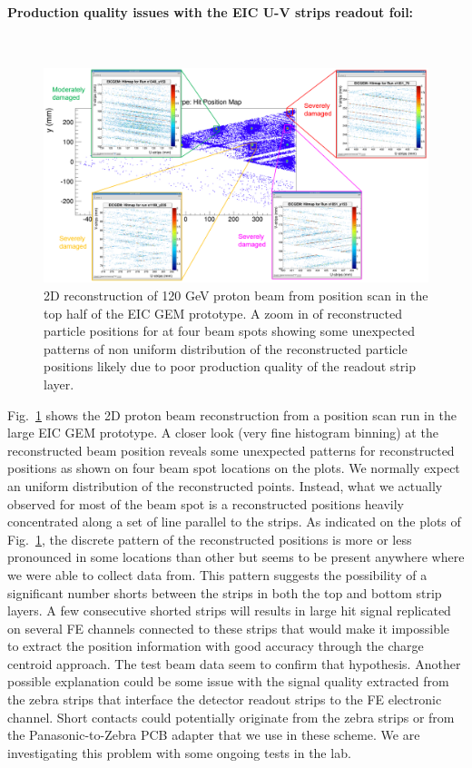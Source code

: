 \paragraph*{Production quality issues with the EIC U-V strips readout foil:}\mbox{}\\
\begin{figure}[htb]
\centering
\includegraphics[width=1\columnwidth,trim={0pt 0mm 0pt 0mm},clip]{UVa_plots/eicPosScan}
\caption{\label{fig:eicPosScan}  2D  reconstruction of 120 GeV proton beam from position scan in the top half of the EIC GEM prototype. A zoom in of  reconstructed particle positions for at four beam spots showing some unexpected patterns of non uniform distribution of the reconstructed particle positions likely due to poor production quality of the readout strip layer.}
\end{figure}
Fig.~\ref{fig:eicPosScan} shows the 2D proton beam reconstruction from a position scan run in the large EIC GEM prototype. A closer look (very fine histogram binning) at the reconstructed beam position  reveals some unexpected patterns for reconstructed positions as shown on  four beam spot locations on the plots. We normally expect an uniform distribution of the reconstructed points. Instead, what we actually observed for most of the beam spot is a reconstructed positions heavily concentrated along a set of line parallel to the strips. As indicated on the plots of Fig.~\ref{fig:eicPosScan}, the discrete pattern of the reconstructed positions is more or less pronounced in some locations than  other but seems to be present anywhere where we were able to collect data from. This pattern suggests the possibility of a significant number shorts between the strips in both the top and bottom strip layers. A few consecutive shorted strips will results in  large hit signal replicated on several FE channels connected to these strips that would make it impossible to extract the  position information with good accuracy through the charge centroid approach. The test beam data  seem to confirm that hypothesis. Another possible explanation could be some issue with the signal quality extracted from the zebra strips that interface the detector readout strips to the FE electronic channel. Short contacts could potentially originate from the zebra strips or from the Panasonic-to-Zebra PCB adapter that we use in these scheme. We are investigating this  problem with some ongoing tests in the lab.
%
